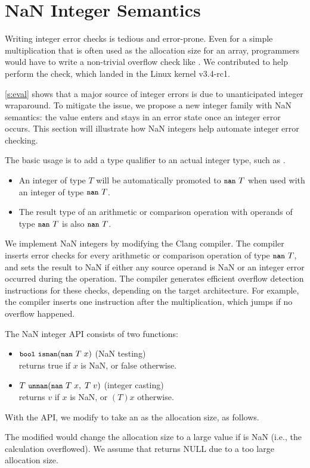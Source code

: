 \section{NaN Integer Semantics}
\label{s:miti}

Writing integer error checks is tedious and error-prone.
Even for a simple multiplication  that is often used
as the allocation size for an array, programmers would
have to write a non-trivial overflow check like .  We contributed 
to help perform the check, which landed in the Linux kernel v3.4-rc1.
\fi

\autoref{s:eval} shows that a major source of integer errors is due
to unanticipated integer wraparound.  To mitigate the issue, we
propose a new integer family with NaN semantics: the value enters
and stays in an error state once an integer error occurs.
%
This section will illustrate how NaN integers help automate integer
error checking.

The basic usage is to add a type qualifier 
to an actual integer type, such as .
\begin{itemize}
\item
An integer of type $T$ will be automatically promoted to $\cc{nan}\ T$
when used with an integer of type $\cc{nan}\ T$.
\item
The result type of an arithmetic or comparison operation with
operands of type $\cc{nan}\ T$ is also $\cc{nan}\ T$.
\end{itemize}
We implement NaN integers by modifying the Clang compiler.
The compiler inserts error checks for every arithmetic or
comparison operation of type $\cc{nan}\ T$, and sets the result to
NaN if either any source operand is NaN or an integer error occurred
during the operation.
%
The compiler generates efficient overflow detection instructions
for these checks, depending on the target architecture.  For example,
the compiler inserts one  instruction after the multiplication,
which jumps if no overflow happened.

The NaN integer API consists of two functions:
\begin{itemize}
\item
$\cc{bool}\ \cc{isnan}(\cc{nan}\ T\; x)$ \hfill (NaN testing) \\
returns true if $x$ is NaN, or false otherwise.
\item
$T\ \cc{unnan}(\cc{nan}\ T\; x,\; T\; v)$ \hfill (integer casting) \\
returns $v$ if $x$ is NaN, or $(T)x$ otherwise.
\end{itemize}
With the API, we modify  to take an  as
the allocation size, as follows.

The modified  would change the allocation size to a large
value  if  is NaN (i.e., the calculation
overflowed).  We assume that  returns
NULL due to a too large allocation size.

